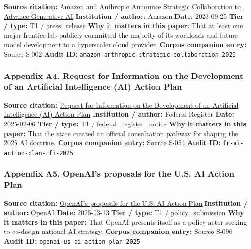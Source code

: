 \documentclass[
  american,
  11pt,
  letterpaper,
]{article}
\begin{document}
\textbf{Source citation:}
\href{https://press.aboutamazon.com/2023/9/amazon-and-anthropic-announce-strategic-collaboration-to-advance-generative-ai}{Amazon
and Anthropic Announce Strategic Collaboration to Advance Generative AI}
\textbf{Institution / author:} Amazon \textbf{Date:} 2023-09-25
\textbf{Tier / type:} T1 / press\_release \textbf{Why it matters in this
paper:} That at least one major frontier lab publicly committed the
majority of its workloads and future model development to a hyperscaler
cloud provider. \textbf{Corpus companion entry:} Source S-002
\textbf{Audit ID:}
\texttt{amazon-anthropic-strategic-collaboration-2023}

\subsubsection{Appendix A4. Request for Information on the Development
of an Artificial Intelligence (AI) Action
Plan}\label{ch-07-appendix-a4-request-for-information-on-the-development-of-an-artificial-intelligence-ai-action-plan}

\textbf{Source citation:}
\href{https://www.federalregister.gov/documents/2025/02/06/2025-02305/request-for-information-on-the-development-of-an-artificial-intelligence-ai-action-plan}{Request
for Information on the Development of an Artificial Intelligence (AI)
Action Plan} \textbf{Institution / author:} Federal Register
\textbf{Date:} 2025-02-06 \textbf{Tier / type:} T1 /
federal\_register\_notice \textbf{Why it matters in this paper:} That
the state created an official consultation pathway for shaping the 2025
AI doctrine. \textbf{Corpus companion entry:} Source S-054 \textbf{Audit
ID:} \texttt{fr-ai-action-plan-rfi-2025}

\subsubsection{Appendix A5. OpenAI's proposals for the U.S. AI Action
Plan}\label{ch-07-appendix-a5-openais-proposals-for-the-us-ai-action-plan}

\textbf{Source citation:}
\href{https://openai.com/global-affairs/openai-proposals-for-the-us-ai-action-plan/}{OpenAI's
proposals for the U.S. AI Action Plan} \textbf{Institution / author:}
OpenAI \textbf{Date:} 2025-03-13 \textbf{Tier / type:} T1 /
policy\_submission \textbf{Why it matters in this paper:} That OpenAI
presents itself as a policy actor seeking to co-design national AI
strategy. \textbf{Corpus companion entry:} Source S-096 \textbf{Audit
ID:} \texttt{openai-us-ai-action-plan-2025}
\end{document}
